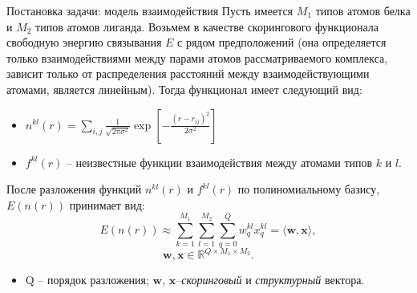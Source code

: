 \documentclass[hyperref={unicode}]{beamer}
\begin{document}
\begin{frame}{Постановка задачи: модель взаимодействия}
\footnotesize Пусть имеется $M_1$ типов атомов белка и $M_2$ типов атомов лиганда. Возьмем в качестве скорингового функционала свободную энергию связывания $E$ с рядом предположений (она определяется только взаимодействиями между парами атомов рассматриваемого комплекса, зависит только от распределения расстояний между взаимодействующими атомами, является линейным).
Тогда функционал имеет следующий вид:
\begin{itemize}
    \item\footnotesize $n^{kl}(r) = \sum_{i,j} \frac{1}{\sqrt{2\pi\sigma^2}} \exp\left[{-\frac{(r-r_{ij})^2}{2\sigma^2}}\right]$
    \item\footnotesize $f^{kl}(r)$ -- неизвестные функции взаимодействия между атомами типов $k$ и $l$.
\end{itemize}

После разложения функций $n^{kl}(r)$ и $f^{kl}(r)$ по полиномиальному базису, $E(n(r))$ принимает вид:
$$E(n(r)) \approx \sum_{k=1}^{M_1} \sum_{l=1}^{M_2} \sum_{q=0}^{Q}w_q^{kl}x_q^{kl} = \langle\mathbf{w},\mathbf{x}\rangle,$$
$$\mathbf{w}, \mathbf{x} \in \mathbb{R}^{Q\times M_1\times M_2}.$$

\begin{itemize}
    \item\footnotesize Q -- порядок разложения; $\mathbf{w}$, $\mathbf{x}$--\textit{скоринговый} и \textit{структурный} вектора.
\end{itemize}

\end{frame}
\end{document}

